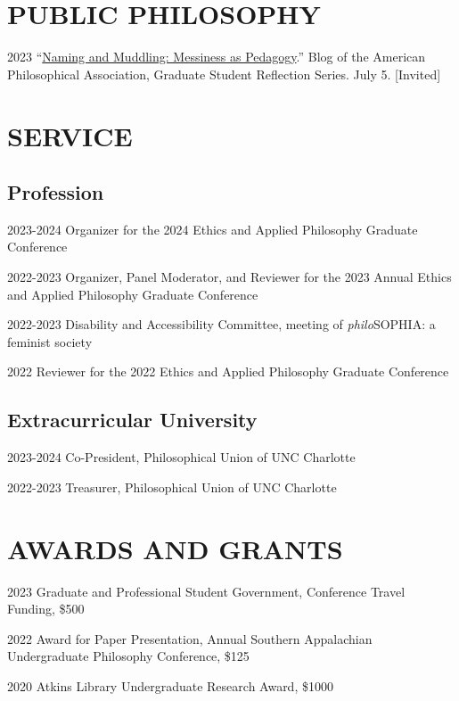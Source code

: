 \documentclass{article}
\begin{document}
\section*{\normalsize{PUBLIC PHILOSOPHY}}
\begin{tablist}
    \item[2023] \tab{}\enquote{\href{https://blog.apaonline.org/2023/07/05/naming-and-muddling-messiness-as-pedagogy/}{Naming and Muddling: Messiness as Pedagogy}.} Blog of the American Philosophical Association, Graduate Student Reflection Series. July 5. [Invited]
\end{tablist}

\section*{\normalsize{SERVICE}}
\subsection*{\normalsize{Profession}}
\begin{tablist}
    \item[2023-2024] \tab{}Organizer for the 2024 Ethics and Applied Philosophy Graduate Conference
    \item[2022-2023] \tab{}Organizer, Panel Moderator, and Reviewer for the 2023 Annual Ethics and Applied Philosophy Graduate Conference
    \item[2022-2023] \tab{}Disability and Accessibility Committee,  meeting of \textit{philo}SOPHIA: a feminist society 
    \item[2022] \tab{}Reviewer for the 2022 Ethics and Applied Philosophy Graduate Conference
\end{tablist}
\subsection*{\normalsize{Extracurricular University}}
\begin{tablist}
    \item[2023-2024] \tab{}Co-President, Philosophical Union of UNC Charlotte
    \item[2022-2023] \tab{}Treasurer, Philosophical Union of UNC Charlotte
\end{tablist}

\section*{\normalsize{AWARDS AND GRANTS}}
\begin{tablist}
    \item[2023] \tab{}Graduate and Professional Student Government, Conference Travel Funding, \$500
    \item[2022] \tab{}Award for Paper Presentation,  Annual Southern Appalachian Undergraduate Philosophy Conference, \$125
    \item[2020] \tab{}Atkins Library Undergraduate Research Award, \$1000
\end{tablist}
\end{document}
